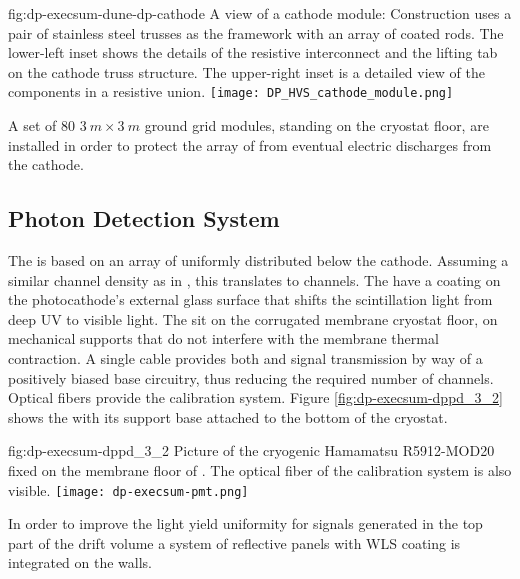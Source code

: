 \begin{dunefigure}{fig:dp-execsum-dune-dp-cathode}
{A view of a  cathode module:  Construction uses a pair of stainless steel trusses as the framework with an array of coated  rods. 
The lower-left inset shows the details of the resistive interconnect and the lifting tab on the cathode truss structure. The upper-right inset is a detailed view of the components in a resistive union.}
\texttt{[image: DP\_HVS\_cathode\_module.png]}
\end{dunefigure}

A set of 80 $3~m \times 3~m$ ground grid modules, standing on the cryostat floor, are installed in order to protect the array of  from eventual electric discharges from the cathode.


\subsection{Photon Detection System}
\label{sec:dp-execsum-pd}

The  is based on an array of  uniformly distributed below the cathode. Assuming a similar channel density as in , this translates to \dpnumpmtch channels. The  have a  coating on the photocathode's external glass surface that shifts the scintillation light from deep UV to visible light. The   sit on the corrugated membrane cryostat floor, on 
mechanical supports that do not interfere with the membrane thermal contraction. 
A single cable provides both  and signal transmission by way of a positively biased base circuitry, thus reducing the required number of \fdth{} channels. Optical fibers provide the calibration system.   Figure \ref{fig:dp-execsum-dppd_3_2} shows the  with its support base attached to the bottom of the  cryostat.

\begin{dunefigure}{fig:dp-execsum-dppd_3_2}
{Picture of the cryogenic Hamamatsu R5912-MOD20  fixed on the membrane floor of . The optical fiber of the calibration system is also visible.}
\texttt{[image: dp-execsum-pmt.png]}
\end{dunefigure}

In order to improve the light yield uniformity for signals generated in the top part of the drift volume a system of reflective panels with WLS coating is integrated on the   walls.


